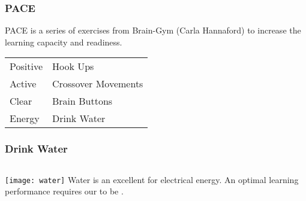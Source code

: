 \documentclass[../main.tex]{subfiles}
\begin{document}
\begin{frame}
\frametitle{PACE}
PACE is a series of exercises from Brain-Gym (Carla Hannaford) to increase the learning capacity and readiness.



\begin{tabular}{ll}
\alert{P}ositive & Hook Ups\\
\alert{A}ctive & Crossover Movements\\
\alert{C}lear & Brain Buttons\\
\alert{E}nergy & Drink Water\\
\end{tabular}

\end{frame}
\begin{frame}
\frametitle{Drink Water}


\begin{columns}[c] %
\texttt{[image: water]}
Water is an excellent  for electrical energy. An optimal learning performance requires our  to be . %
\end{columns}
\end{frame}
\end{document}
